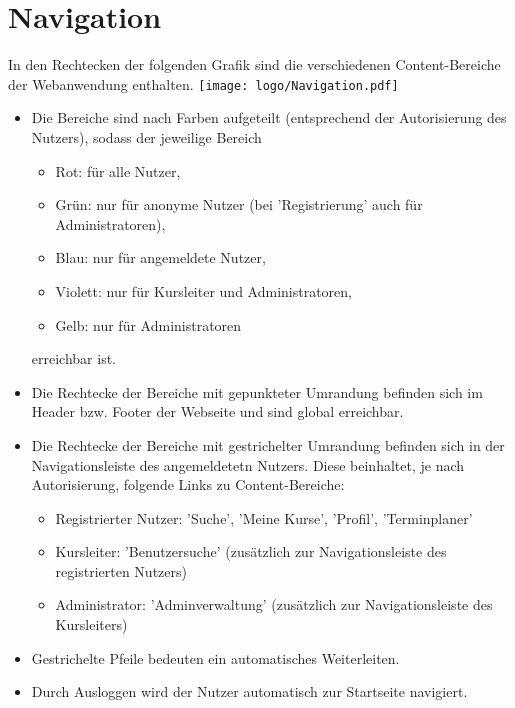 \documentclass[a4paper]{scrreprt}
\begin{document}
    \section{Navigation}
	    In den Rechtecken der folgenden Grafik sind die verschiedenen Content-Bereiche der Webanwendung enthalten.
		    \newline
		    \newline
			    \texttt{[image: logo/Navigation.pdf]}
		    \newline
    
		\begin{itemize}
			\item Die Bereiche sind  nach Farben aufgeteilt (entsprechend der Autorisierung des Nutzers), sodass der jeweilige Bereich
		\begin{itemize}
		    \item Rot: für alle Nutzer,
		    \item Grün: nur für anonyme Nutzer (bei 'Registrierung' auch für Administratoren),
		    \item Blau: nur für angemeldete Nutzer,
		    \item Violett: nur für Kursleiter und Administratoren,
		    \item Gelb: nur für Administratoren
	    \end{itemize}
	    erreichbar ist.
		\item Die Rechtecke der Bereiche mit gepunkteter Umrandung befinden sich im  Header bzw. Footer der Webseite und sind global erreichbar.
		\item Die Rechtecke der Bereiche mit gestrichelter Umrandung befinden sich in der Navigationsleiste des angemeldetetn Nutzers. Diese beinhaltet, je nach Autorisierung, folgende Links zu Content-Bereiche:
		
		\begin{itemize}
		\item Registrierter Nutzer: 'Suche', 'Meine Kurse', 'Profil', 'Terminplaner'
		\item Kursleiter: 'Benutzersuche' (zusätzlich zur Navigationsleiste des registrierten Nutzers)
		\item Administrator: 'Adminverwaltung' (zusätzlich zur Navigationsleiste des Kursleiters)
		\end{itemize}		
		
	    \item Gestrichelte Pfeile bedeuten ein automatisches Weiterleiten.
	    \item Durch Ausloggen wird der Nutzer automatisch zur Startseite navigiert.
	    

\end{itemize}
\end{document}
